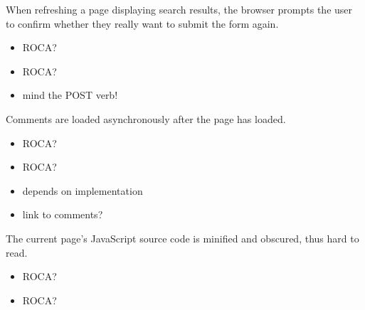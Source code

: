 \documentclass{beamer}
\newcommand{\rocaok}{\ding{51}}
\newcommand{\rocafail}{\ding{55}}
\begin{document}
\begin{frame}
  When refreshing a page displaying search results, the browser prompts the
  user to confirm whether they really want to submit the form again.

  \vspace{0.3cm}
  \begin{itemize}
    \item<1|only@1>[\Large $\square$] \Large ROCA?
    \item<2|only@2>[\Large \rocafail] \Large ROCA?
    \item<2> mind the POST verb!
  \end{itemize}

\end{frame}

\begin{frame}
  Comments are loaded asynchronously after the page has loaded.

  \vspace{0.3cm}
  \begin{itemize}
    \item<1|only@1>[\Large $\square$] \Large ROCA?
    \item<2|only@2>[\Large \rocaok] \Large ROCA?
    \item<2> depends on implementation
    \item<2> link to comments?
  \end{itemize}

\end{frame}

\begin{frame}
  The current page's JavaScript source code is minified and obscured, thus hard
  to read.

  \vspace{0.3cm}
  \begin{itemize}
    \item<1|only@1>[\Large $\square$] \Large ROCA?
    \item<2|only@2>[\Large \rocaok] \Large ROCA?
  \end{itemize}

\end{frame}
\end{document}
